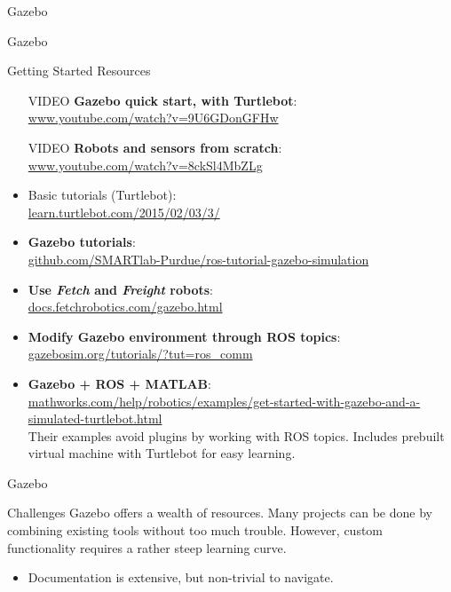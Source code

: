 \documentclass[9pt]{beamer}
\begin{document}
\begin{section}{Gazebo}
    \begin{frame}{Gazebo}
        \begin{block}{Getting Started Resources}
            \begin{itemize}
                \item [VIDEO] \textbf{Gazebo quick start, with Turtlebot}: \\
                \url{www.youtube.com/watch?v=9U6GDonGFHw}
                \item [VIDEO] \textbf{Robots and sensors from scratch}: \\
                \url{www.youtube.com/watch?v=8ckSl4MbZLg}
                \item Basic tutorials (Turtlebot): \\
                \url{learn.turtlebot.com/2015/02/03/3/}
                \item \textbf{Gazebo tutorials}: \\
                \url{github.com/SMARTlab-Purdue/ros-tutorial-gazebo-simulation}
                \item \textbf{Use \textit{Fetch} and \textit{Freight} robots}: \\
                \url{docs.fetchrobotics.com/gazebo.html}
                \item \textbf{Modify Gazebo environment through ROS topics}: \\
                \url{gazebosim.org/tutorials/?tut=ros_comm}
                \item \textbf{Gazebo + ROS + MATLAB}: \\
                \url{mathworks.com/help/robotics/examples/get-started-with-gazebo-and-a-simulated-turtlebot.html} \\
                Their examples avoid plugins by working with ROS topics. 
                Includes prebuilt virtual machine with Turtlebot for easy learning.
            \end{itemize}
        \end{block}
    \end{frame}
    \begin{frame}{Gazebo}
        \begin{block}{Challenges}
        Gazebo offers a wealth of resources. Many projects can be done by combining existing tools without too much trouble. However, custom functionality requires a rather steep learning curve.
            \begin{itemize}
                \item Documentation is extensive, but non-trivial to navigate. 

\end{itemize}
\end{block}
\end{frame}
\end{section}
\end{document}
